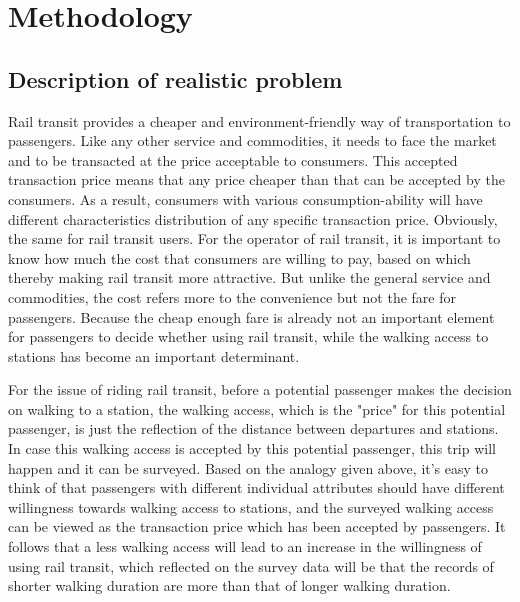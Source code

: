%
\section{Methodology}

\subsection{Description of realistic problem}
Rail transit provides a cheaper and environment-friendly way of transportation to passengers. Like any other service and commodities, it needs to face the market and to be transacted at the price acceptable to consumers. This accepted transaction price means that any price cheaper than that can be accepted by the consumers. As a result, consumers with various consumption-ability will have different characteristics distribution of any specific transaction price. Obviously, the same for rail transit users. For the operator of rail transit, it is important to know how much the cost that consumers are willing to pay, based on which thereby making rail transit more attractive. But unlike the general service and commodities, the cost refers more to the convenience but not the fare for passengers. Because the cheap enough fare is already not an important element for passengers to decide whether using rail transit, while the walking access to stations has become an important determinant.

For the issue of riding rail transit, before a potential passenger makes the decision on walking to a station, the walking access, which is the "price" for this potential passenger, is just the reflection of the distance between departures and stations. In case this walking access is accepted by this potential passenger, this trip will happen and it can be surveyed. Based on the analogy given above, it's easy to think of that passengers with different individual attributes should have different willingness towards walking access to stations, and the surveyed walking access can be viewed as the transaction price which has been accepted by passengers. It follows that a less walking access will lead to an increase in the willingness of using rail transit, which reflected on the survey data will be that the records of shorter walking duration are more than that of longer walking duration. 

